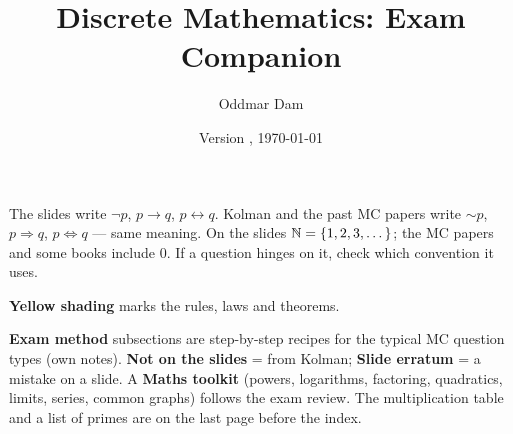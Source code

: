 \documentclass{fkt-notes}
\author{Oddmar Dam}
\title{Discrete Mathematics: Exam Companion}
\date{Version \docversion, \today}
\theoremstyle{definition}
\begin{document}
\maketitle

\begin{keybox}[title={Notation bridge: slides vs.\ Kolman vs.\ past MC papers}]
  The slides write $\neg p$, $p\to q$, $p\leftrightarrow q$. Kolman and the
  past MC papers write $\sim p$, $p\Rightarrow q$, $p\Leftrightarrow q$ ---
  same meaning. On the slides $\mathbb{N}=\{1,2,3,\dots\}$; the MC papers and some
  books include $0$. If a question hinges on it, check which convention it
  uses.
\end{keybox}

\begin{rulepar}\noindent\textbf{Yellow shading} marks the rules, laws and theorems.\end{rulepar}

\noindent\textbf{Exam method} subsections are step-by-step recipes for the typical MC question types (own notes). \textbf{Not on the slides} = from Kolman; \textbf{Slide erratum} = a mistake on a slide. A \textbf{Maths toolkit} (powers, logarithms, factoring, quadratics, limits, series, common graphs) follows the exam review. The multiplication table and a list of primes are on the last page before the index.

\tableofcontents
\end{document}
